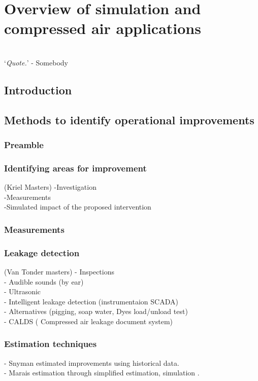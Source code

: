 \chapter{Overview of simulation and compressed air applications}
\thispagestyle{empty}
\vspace{38em}
\hrulefill
\\
\enquote*{\textit{Quote.}} - Somebody\\
\newpage
\section{Introduction}
\section{Methods to identify operational improvements}
	\subsection{Preamble}
	\subsection{Identifying areas for improvement}
		(Kriel Masters)
		-Investigation\\
		-Measurements\\
		-Simulated impact of the proposed intervention\\
	\subsection{Measurements}	
	\subsection{Leakage detection}
		(Van Tonder masters)
		- Inspections\\
		- Audible sounds (by ear)\\
		- Ultrasonic\\
		- Intelligent leakage detection (instrumentaion SCADA)\\
		- Alternatives (pigging, soap water, Dyes load/unload test)\\
		-  CALDS ( Compressed air leakage document system)\\

	\subsection{Estimation techniques}
		- Snyman estimated improvements using historical data.\cite{Snyman2011Masters}\\
		- Marais estimation through simplified estimation, simulation \cite{Marais2012PhD, marais2013simplification}.

